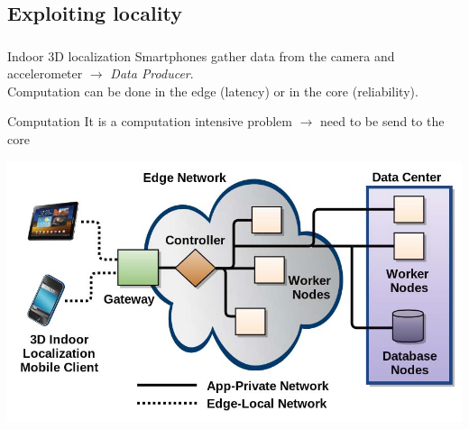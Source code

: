 \documentclass[utf8,xcolor=table, page number]{earlywinter}
\begin{document}
\subsection{Exploiting locality}
\begin{frame}
  \frametitle{\secname}
  \framesubtitle{\subsecname}

  \begin{exampleblock}{Indoor 3D localization}
    Smartphones gather data from the camera and accelerometer $\to$ \emph{Data Producer}.\\
    Computation can be done in the edge (latency) or in the core (reliability).
  \end{exampleblock}

  \begin{minipage}[l]{0.3\linewidth}
    \begin{exampleblock}{Computation}
      It is a computation intensive problem $\to$ need to be send to the core
    \end{exampleblock}
  \end{minipage}
  \begin{minipage}[l]{0.65\linewidth}
  \begin{center}
  \includegraphics[scale=0.2]{indoor}
  \end{center}
  \end{minipage}

\end{frame}
\end{document}
